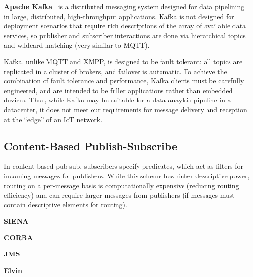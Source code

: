 \textbf{Apache Kafka}~\cite{kreps2011kafka} is a distributed messaging system designed for data pipelining in large, distributed, high-throughput applications.
Kafka is not designed for deployment scenarios that require rich descriptions of the array of available data services, so publisher and subscriber interactions are done via hierarchical topics and wildcard matching (very similar to MQTT).

Kafka, unlike MQTT and XMPP, is designed to be fault tolerant: all topics are replicated in a cluster of brokers, and failover is automatic.
To achieve the combination of fault tolerance and performance, Kafka clients must be carefully engineered, and are intended to be fuller applications rather than embedded devices.
Thus, while Kafka may be suitable for a data anaylsis pipeline in a datacenter, it does not meet our requirements for message delivery and reception at the ``edge'' of an IoT network.

\subsection{Content-Based Publish-Subscribe}

In content-based pub-sub, subscribers specify predicates, which act as filters for incoming messages for publishers.
While this scheme has richer descriptive power, routing on a per-message basis is computationally expensive (reducing routing efficiency) and can require larger messages from publishers (if messages must contain descriptive elements for routing).

\textbf{SIENA}

\textbf{CORBA}

\textbf{JMS}

\textbf{Elvin}
